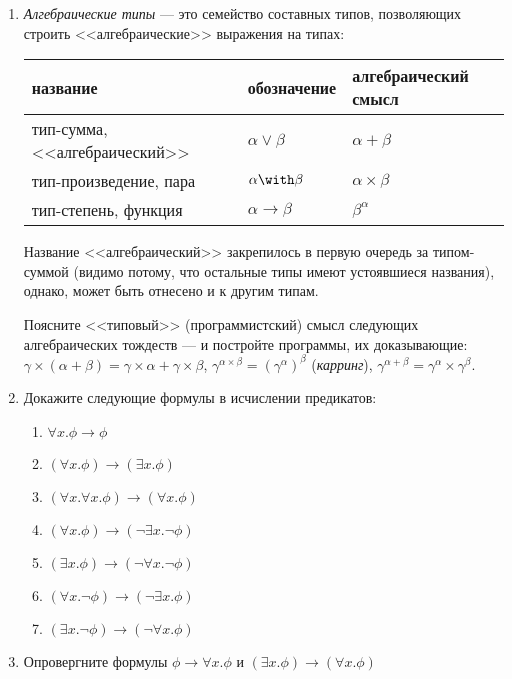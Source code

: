 \documentclass[10pt,a4paper,oneside]{article}
\begin{document}
\begin{enumerate}
\item \emph{Алгебраические типы} --- это семейство составных типов, 
позволяющих строить <<алгебраические>> выражения на типах:

\begin{tabular}{lll}
название & обозначение & алгебраический смысл\\\hline
тип-сумма, <<алгебраический>> & $\alpha\vee\beta$ & $\alpha+\beta$\\
тип-произведение, пара & $\alpha\with\beta$ & $\alpha\times\beta$\\
тип-степень, функция & $\alpha\to\beta$&$\beta^\alpha$
\end{tabular}

Название <<алгебраический>> закрепилось в первую очередь за типом-суммой (видимо потому,
что остальные типы имеют устоявшиеся названия), однако, может быть отнесено и к другим
типам.

Поясните <<типовый>> (программистский) смысл следующих алгебраических тождеств --- и постройте
программы, их доказывающие: $\gamma\times(\alpha+\beta) = \gamma\times\alpha + \gamma\times\beta$,
$\gamma^{\alpha\times\beta} = {(\gamma^\alpha)}^\beta$ (\emph{карринг}),
$\gamma^{\alpha+\beta} = \gamma^\alpha\times\gamma^\beta$.

\item Докажите следующие формулы в исчислении предикатов:
\begin{enumerate}
\item $\forall x.\phi\rightarrow \phi$
\item $(\forall x.\phi)\rightarrow (\exists x.\phi)$
\item $(\forall x.\forall x.\phi) \rightarrow (\forall x.\phi)$
\item $(\forall x.\phi) \rightarrow (\neg \exists x.\neg \phi)$ 
\item $(\exists x.\phi) \rightarrow (\neg \forall x.\neg \phi)$
\item $(\forall x.\neg\phi) \rightarrow (\neg \exists x.\phi)$ 
\item $(\exists x.\neg\phi) \rightarrow (\neg \forall x.\phi)$
\end{enumerate}

\item Опровергните формулы $\phi\rightarrow\forall x. \phi$ и $(\exists x.\phi)\rightarrow (\forall x.\phi)$


\end{enumerate}
\end{document}
